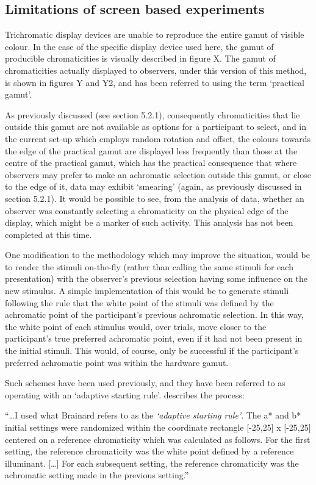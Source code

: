 \subsection{Limitations of screen based experiments}

Trichromatic display devices are unable to reproduce the entire gamut of visible colour. In the case of the specific display device used here, the gamut of producible chromaticities is visually described in figure X. The gamut of chromaticities actually displayed to observers, under this version of this method, is shown in figures Y and Y2, and has been referred to using the term `practical gamut'.

As previously discussed (see section 5.2.1), consequently chromaticities that lie outside this gamut are not available as options for a participant to select, and in the current set-up which employs random rotation and offset, the colours towards the edge of the practical gamut are displayed less frequently than those at the centre of the practical gamut, which has the practical consequence that where observers may prefer to make an achromatic selection outside this gamut, or close to the edge of it, data may exhibit `smearing' (again, as previously discussed in section 5.2.1). It would be possible to see, from the analysis of data, whether an observer was constantly selecting a chromaticity on the physical edge of the display, which might be a marker of such activity. This analysis has not been completed at this time.

One modification to the methodology which may improve the situation, would be to render the stimuli on-the-fly (rather than calling the same stimuli for each presentation) with the observer's previous selection having some influence on the new stimulus. A simple implementation of this would be to generate stimuli following the rule that the white point of the stimuli was defined by the achromatic point of the participant's previous achromatic selection. In this way, the white point of each stimulus would, over trials, move closer to the participant's true preferred achromatic point, even if it had not been present in the initial stimuli. This would, of course, only be successful if the participant's preferred achromatic point was within the hardware gamut. 

Such schemes have been used previously, and they have been referred to as operating with an `adaptive starting rule'. \citet{delahunt_evaluation_2001} describes the process:

\begin{displayquote}
``\dots I used what Brainard refers to as the \emph{`adaptive starting rule'}. The a* and b* initial settings were randomized within the coordinate rectangle [-25,25] x [-25,25] centered on a reference chromaticity which was calculated as follows. For the first setting, the reference chromaticity was the white point defined by a reference illuminant. [\dots] For each subsequent setting, the reference chromaticity was the achromatic setting made in the previous setting.''
\end{displayquote}

